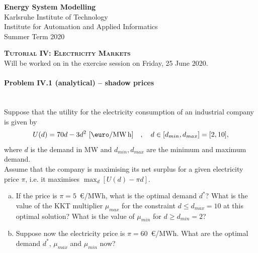 \documentclass[11pt,a4paper,fleqn]{scrartcl}
\begin{document}
\begin{flushright}
 \textbf{Energy System Modelling }\\
 {\small Karlsruhe Institute of Technology}\\
 {\small Institute for Automation and Applied Informatics}\\
 {\small Summer Term 2020}\\
\end{flushright}

 
 \vspace{-0.5em}
 \hrulefill
 \vspace{0.3em}

\begin{center}
 \textbf{\textsc{\Large Tutorial IV: Electricity Markets}}\\
 \small Will be worked on in the exercise session on Friday, 25 June 2020.\\[1.5em]
\end{center}

\vspace{-0.5em}
\hrulefill
\vspace{0.8em}

\paragraph{Problem IV.1 (analytical) -- shadow prices}~\\

Suppose that the utility for the electricity consumption of an industrial company is given by
\[
 U(d) = 70d - 3d^2 ~[\textrm{\euro}/\si{\mega\watt\hour}] \quad , \quad d\in [d_{min},d_{max}]=[2,10],
\]
where $d$ is the demand in MW and $d_{min}, d_{max}$ are the minimum and maximum demand. \\
[1em]
Assume that the company is maximising its net surplus for a given electricity price $\pi$, i.e. it maximises $\max_{d} \left[U(d) -
  \pi d\right]$.
\begin{enumerate}[(a)]
 \item  If the price is $\pi = 5$~\euro/MWh, what is the optimal
       demand $d^*$?  What is the value of the KKT multiplier $\mu_{max}$
       for the constraint $d \leq d_{max}=10$ at this optimal solution?
       What is the value of $\mu_{min}$ for $d \geq d_{min} = 2$?
 \item Suppose now the electricity price is $\pi = 60$~\euro/MWh. What are
       the optimal demand $d^*$, $\mu_{max}$ and $\mu_{min}$ now?
\end{enumerate}
\end{document}
